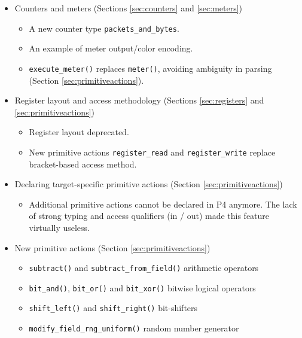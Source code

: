 \documentclass[12pt]{article}
\begin{document}

\begin{itemize}

\item Counters and meters (Sections \ref{sec:counters} and \ref{sec:meters})
  \begin{itemize}
  \item A new counter type \texttt{packets_and_bytes}.
  \item An example of meter output/color encoding.
  \item \texttt{execute_meter()} replaces \texttt{meter()}, avoiding
  ambiguity in parsing (Section \ref{sec:primitiveactions}). 
  \end{itemize}

\item Register layout and access methodology (Sections \ref{sec:registers} and \ref{sec:primitiveactions})
  \begin{itemize}
  \item Register layout deprecated.  
  \item New primitive actions \texttt{register_read} and \texttt{register_write} replace bracket-based access method. 
  \end{itemize}

\item Declaring target-specific primitive actions (Section \ref{sec:primitiveactions})
  \begin{itemize}
  \item Additional primitive actions cannot be declared in P4 anymore. The lack
  of strong typing and access qualifiers (in / out) made this feature virtually
  useless.
  \end{itemize}

\item New primitive actions (Section \ref{sec:primitiveactions})
  \begin{itemize}
  \item \texttt{subtract()} and \texttt{subtract_from_field()} arithmetic operators
  \item \texttt{bit_and()}, \texttt{bit_or()} and \texttt{bit_xor()} bitwise logical operators
  \item \texttt{shift_left()} and \texttt{shift_right()} bit-shifters 
  \item \texttt{modify_field_rng_uniform()} random number generator
  \end{itemize}


\end{itemize}
\end{document}
